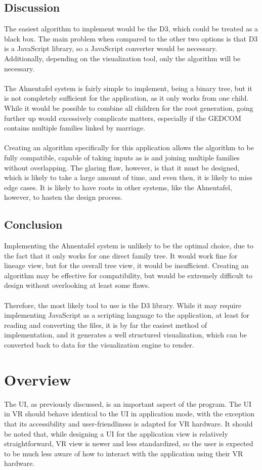 \documentclass[onecolumn, draftclsnofoot,10pt, compsoc]{IEEEtran}
\begin{document}
\subsection{Discussion}
The easiest algorithm to implement would be the D3, which could be treated as a black box. The main problem when compared to the other two options is that D3 is a JavaScript library, so a JavaScript converter would be necessary. Additionally, depending on the visualization tool, only the algorithm will be necessary.
\\
\\
The Ahnentafel system is fairly simple to implement, being a binary tree, but it is not completely sufficient for the application, as it only works from one child. While it would be possible to combine all children for the root generation, going further up would excessively complicate matters, especially if the GEDCOM contains multiple families linked by marriage.
\\
\\
Creating an algorithm specifically for this application allows the algorithm to be fully compatible, capable of taking inputs as is and joining multiple families without overlapping. The glaring flaw, however, is that it must be designed, which is likely to take a large amount of time, and even then, it is likely to miss edge cases. It is likely to have roots in other systems, like the Ahnentafel, however, to hasten the design process.

\subsection{Conclusion}
Implementing the Ahnentafel system is unlikely to be the optimal choice, due to the fact that it only works for one direct family tree. It would work fine for lineage view, but for the overall tree view, it would be insufficient. Creating an algorithm may be effective for compatibility, but would be extremely difficult to design without overlooking at least some flaws.
\\
\\
Therefore, the most likely tool to use is the D3 library. While it may require implementing JavaScript as a scripting language to the application, at least for reading and converting the files, it is by far the easiest method of implementation, and it generates a well structured visualization, which can be converted back to data for the visualization engine to render.

\section{Overview}
The UI, as previously discussed, is an important aspect of the program. The UI in VR should behave identical to the UI in application mode, with the exception that its accessibility and user-friendliness is adapted for VR hardware. It should be noted that, while designing a UI for the application view is relatively straightforward, VR view is newer and less standardized, so the user is expected to be much less aware of how to interact with the application using their VR hardware.
\end{document}
